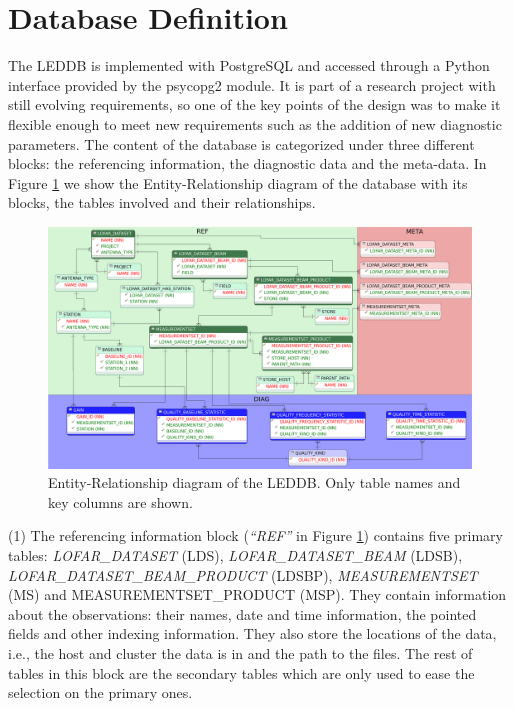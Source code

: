 \section{Database Definition} 

The LEDDB is implemented with PostgreSQL and accessed through a Python interface provided by the psycopg2 module. It is part of a research project with still evolving requirements, so one of the key points of the design was to make it flexible enough to meet new requirements such as the addition of new diagnostic parameters. The content of the database is categorized under three different blocks: the referencing information, the diagnostic data and the meta-data. In Figure \ref{fig:leddber} we show the Entity-Relationship diagram of the database with its blocks, the tables involved and their relationships.
\begin{figure}[!ht]
  \centering
    \includegraphics[scale=0.077]{part10/Martinez-rubi_O23/O23_f1.eps} 
  \caption{Entity-Relationship diagram of the LEDDB. Only table names and key columns are shown.}
  \label{fig:leddber}
\end{figure}

(1) The referencing information block (\textit{``REF''} in Figure \ref{fig:leddber}) contains five primary tables: \textit{LOFAR\-\_DATA\-SET} (LDS), \textit{LOFAR\-\_DATA\-SET\-\_BEAM} (LDSB), \textit{LOFAR\-\_DATA\-SET\-\_BEAM\-\_PRODUCT} (LDSBP), \textit{MEA\-SU\-RE\-MENT\-SET} (MS) and {MEA\-SU\-RE\-MENT\-SET\-\_PRODUCT} (MSP). They contain information about the observations: their names, date and time information, the pointed fields and other indexing information. They also store the locations of the data, i.e., the host and cluster the data is in and the path to the files. The rest of tables in this block are the secondary tables which are only used to ease the selection on the primary ones.


